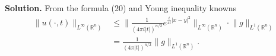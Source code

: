\documentclass[a4paper]{book}
\newenvironment{solution}%
{\noindent\textbf{Solution.}}%
{\qedhere}
\numberwithin{equation}{chapter}
\theoremstyle{definition}
\begin{document}
\begin{solution}
  From the formula (20) and Young inequality knowns
  \begin{align*}
              \lVert u(\cdot,t) \rVert_{L^\infty (\mathbb{R}^n)} &\leq \lVert \frac{1}{(4 \pi i \left| t \right|)^{n/2}} e^{\frac{i}{4t}\left| x - y \right|^2} \rVert_{L^\infty(\mathbb{R}^n)} \cdot \lVert g\rVert_{L^1(\mathbb{R}^n)} \\
                            &= \frac{1}{(4 \pi \left| t \right|)^{n/2}} \lVert g \rVert_{L^1(\mathbb{R}^n)}.
  \end{align*}
\end{solution}



%   

%   

%   


\end{document}
